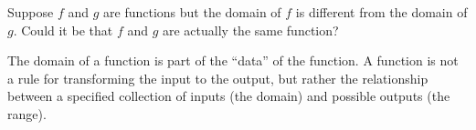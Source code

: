 \documentclass{ximera}
\begin{document}
\begin{problem}
  Suppose $f$ and $g$ are functions but the domain of $f$ is different
  from the domain of $g$.  Could it be that $f$ and $g$ are actually
  the same function?

  \begin{multipleChoice}
  \end{multipleChoice}

  \begin{feedback}
    The domain of a function is part of the ``data'' of the function.
    A function is not a rule for transforming the input to the output,
    but rather the relationship between a specified collection of
    inputs (the domain) and possible outputs (the range).
  \end{feedback}
\end{problem}

\end{document}
